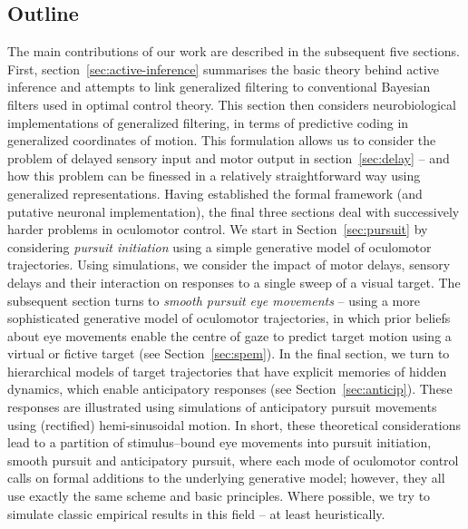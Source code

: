 \documentclass[a4paper]{article} %
\begin{document}
\subsection{Outline}
The main contributions of our work are described in the subsequent five sections. First, section~\ref{sec:active-inference} summarises the basic theory behind active inference and attempts to link generalized filtering to conventional Bayesian filters used in optimal control theory. This section then considers neurobiological implementations of generalized filtering, in terms of predictive coding in generalized coordinates of motion. This formulation allows us to consider the problem of delayed sensory input and motor output in section~\ref{sec:delay} -- and how this problem can be finessed in a relatively straightforward way using generalized representations. %
%
Having established the formal framework
(and putative neuronal implementation), the final three sections deal with
successively harder problems in oculomotor control. We start in
Section~\ref{sec:pursuit} by considering \emph{pursuit initiation} using a
simple generative model of oculomotor trajectories. Using simulations, we
consider the impact of motor delays, sensory delays and their interaction on
responses to a single sweep of a visual target. The subsequent section turns to
\emph{smooth pursuit eye movements} -- using a more sophisticated generative
model of oculomotor trajectories, in which prior beliefs about eye movements
enable the centre of gaze to predict target motion using a virtual or fictive
target (see Section~\ref{sec:spem}). In the final section, we turn to
hierarchical models of target trajectories that have explicit memories of hidden
dynamics, which enable anticipatory responses (see Section~\ref{sec:anticip}).
These responses are illustrated using simulations of anticipatory pursuit
movements using (rectified) hemi-sinusoidal motion. In short, these theoretical
considerations lead to a partition of stimulus--bound eye movements into pursuit
initiation, smooth pursuit and anticipatory pursuit, where each mode of
oculomotor control calls on formal additions to the underlying generative model;
however, they all use exactly the same scheme and basic principles. Where
possible, we try to simulate classic empirical results in this field -- at least
heuristically.
\end{document}
